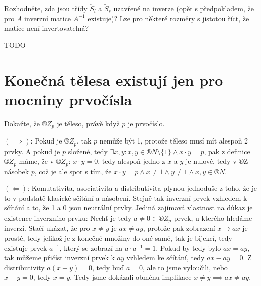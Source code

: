 \documentclass[12pt]{article}					%
\begin{document}
    \begin{priklad}[5.3]
        Rozhodněte, zda jsou třídy $\check S_l$ a $\check S_s$ uzavřené na inverze (opět s předpokladem, že pro $A$ inverzní matice $A^{-1}$ existuje)? Lze pro některé rozměry s jistotou říct, že matice není invertovatelná?

        \begin{reseni}
            TODO
        \end{reseni}
    \end{priklad}




\section{Konečná tělesa existují jen pro mocniny prvočísla}
    \begin{priklad}[6.1]
        Dokažte, že $®Z_p$ je těleso, právě když $p$ je prvočíslo.

        \begin{dukazin}
            $(\implies)$: Pokud je $®Z_p$, tak $p$ nemůže být 1, protože těleso musí mít alespoň 2 prvky. A pokud je $p$ složené, tedy $\exists x, y: x,y\in®N \setminus \{1\} \land x·y = p$, pak z definice $®Z_p$ máme, že v $®Z_p$: $x·y=0$, tedy alespoň jedno z $x$ a $y$ je nulové, tedy v ®Z násobek $p$, což je ale spor s tím, že $x·y = p \land x ≠ 1 \land y≠1 \land x, y \in ®N$.

            $(\Leftarrow)$: Komutativita, asociativita a distributivita plynou jednoduše z toho, že je to v podstatě klasické sčítání a násobení. Stejně tak inverzní prvek vzhledem k sčítání a to, že 1 a 0 jsou neutrální prvky. Jediná zajímavá vlastnost na důkaz je existence inverzního prvku: Nechť je tedy $a ≠ 0 \in ®Z_p$ prvek, u kterého hledáme inverzi. Stačí ukázat, že pro $x ≠ y$ je $ax ≠ ay$, protože pak zobrazení $x \rightarrow ax$ je prosté, tedy jelikož je z konečné množiny do oné samé, tak je bijekcí, tedy existuje prvek $a^{-1}$, který se zobrazí na $a·a^{-1} = 1$. Pokud by tedy bylo $ax = ay$, tak můžeme přičíst inverzní prvek k $ay$ vzhledem ke sčítání, tedy $ax - ay = 0$. Z distributivity $a(x-y) = 0$, tedy buď $a=0$, ale to jsme vyloučili, nebo $x-y = 0$, tedy $x = y$. Tedy jsme dokázali obměnu implikace $x≠y \implies ax ≠ ay$.
        \end{dukazin}
    \end{priklad}
\end{document}
